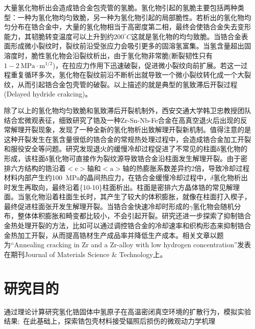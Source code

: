 大量氢化物析出会造成锆合金包壳管的氢脆。氢化物引起的氢脆主要包括两种类型：一种为氢化物均匀致脆，另一种为氢化物引起的局部脆性。若析出的氢化物均匀分布在锆合金中，大量的氢化物相当于高密度第二相，最终会使锆合金失去变形能力，其韧脆转变温度可以上升到约$200^{\circ}C$这就是氢化物的均匀致脆。当锆合金表面形成微小裂纹时，裂纹前沿受张应力会吸引更多的固溶氢富集。当氢含量超出固溶度时，脆性氢化物会沿裂纹析出，由于氢化物非常脆\textrm{(断裂韧性只有$1-2~\mathrm{MPa·m^{1/2}}$)}，在拉应力作用下迅速破裂，促进微小裂纹向前扩展。若这一过程重复循环多次，氢化物在裂纹前沿不断析出就导致一个微小裂纹转化成一个大裂纹，从而引起锆合金包壳管的破裂。以上描述的就是典型的氢致滞后开裂过程\textrm{(Delayed hydride crakcing)}。

除了以上的氢化物均匀致脆和氢致滞后开裂机制外，西安交通大学韩卫忠教授团队结合宏微观表征，细致研究了锆及一种\textrm{Zr-Sn-Nb-Fe}合金在高真空退火后出现的反常解理开裂现象，发现了一种全新的氢化物析出致解理开裂新机制。值得注意的是这种开裂发生在氢含量很低的锆合金的常规热处理过程中，会造成锆合金加工开裂和服役安全等问题。研究发现退火的缓慢冷却过程促进了不常见的柱面δ氢化物的形成，该柱面δ氢化物可直接作为裂纹源导致锆合金沿柱面发生解理开裂。由于密排六方结构的锆沿着$<\mathrm{c}>$轴和$<\mathrm{a}>$轴的热膨胀系数差异约2倍，导致冷却过程材料内部产生约\textrm{100~MPa}的晶间热应力，在锆合金缓慢冷却过程中，$\delta$氢化物析出时发生再取向，最终沿着\{10-10\}柱面析出。柱面是密排六方晶体锆的常见解理面。当氢化物沿着柱面生长时，其产生了较大的体积膨胀，就像在柱面打入楔子，最终促进柱面张开发生解理开裂。当锆合金快速冷却时形成的$\gamma$氢化物会随机分布，整体体积膨胀和畸变都比较小，不会引起开裂。研究还进一步探索了抑制锆合金热处理开裂的方法，比如可以通过调控锆合金的冷却速率和织构形态来抑制锆合金热加工开裂，从而提高锆材生产成品率并降低生产成本。相关文章以题为\textrm{``Annealing cracking in Zr and a Zr-alloy with low hydrogen concentration''}发表在期刊\textrm{Journal of Materials Science \& Technology}上。

\section{研究目的} 
通过理论计算研究氢化锆固体中氢原子在高温密闭真空环境的扩散行为，模拟实验结果;~在此基础上，探索锆包壳材料接受辐照后损伤的微观动力学机理

